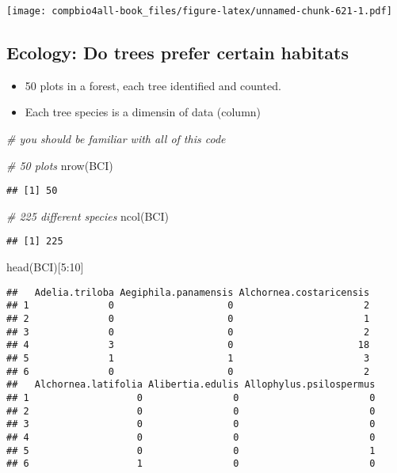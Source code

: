 \documentclass[
]{book}
\newenvironment{Shaded}{\begin{snugshade}}{\end{snugshade}}
\newcommand{\CommentTok}[1]{\textcolor[rgb]{0.56,0.35,0.01}{\textit{#1}}}
\newcommand{\DecValTok}[1]{\textcolor[rgb]{0.00,0.00,0.81}{#1}}
\newcommand{\FunctionTok}[1]{\textcolor[rgb]{0.00,0.00,0.00}{#1}}
\newcommand{\NormalTok}[1]{#1}
\newcommand{\SpecialCharTok}[1]{\textcolor[rgb]{0.00,0.00,0.00}{#1}}
\providecommand{\tightlist}{%
  \setlength{\itemsep}{0pt}\setlength{\parskip}{0pt}}
\begin{document}
\texttt{[image: compbio4all-book\_files/figure-latex/unnamed-chunk-621-1.pdf]}

\hypertarget{ecology-do-trees-prefer-certain-habitats}{%
\subsection{Ecology: Do trees prefer certain habitats}\label{ecology-do-trees-prefer-certain-habitats}}

\begin{itemize}
\tightlist
\item
  50 plots in a forest, each tree identified and counted.
\item
  Each tree species is a dimensin of data (column)
\end{itemize}

\begin{Shaded}
\begin{Highlighting}[]
\CommentTok{\# you should be familiar with all of this code}

\CommentTok{\# 50 plots}
\FunctionTok{nrow}\NormalTok{(BCI)}
\end{Highlighting}
\end{Shaded}

\begin{verbatim}
## [1] 50
\end{verbatim}

\begin{Shaded}
\begin{Highlighting}[]
\CommentTok{\# 225 different species}
\FunctionTok{ncol}\NormalTok{(BCI)}
\end{Highlighting}
\end{Shaded}

\begin{verbatim}
## [1] 225
\end{verbatim}

\begin{Shaded}
\begin{Highlighting}[]
\FunctionTok{head}\NormalTok{(BCI)[}\DecValTok{5}\SpecialCharTok{:}\DecValTok{10}\NormalTok{]}
\end{Highlighting}
\end{Shaded}

\begin{verbatim}
##   Adelia.triloba Aegiphila.panamensis Alchornea.costaricensis
## 1              0                    0                       2
## 2              0                    0                       1
## 3              0                    0                       2
## 4              3                    0                      18
## 5              1                    1                       3
## 6              0                    0                       2
##   Alchornea.latifolia Alibertia.edulis Allophylus.psilospermus
## 1                   0                0                       0
## 2                   0                0                       0
## 3                   0                0                       0
## 4                   0                0                       0
## 5                   0                0                       1
## 6                   1                0                       0
\end{verbatim}
\end{document}
